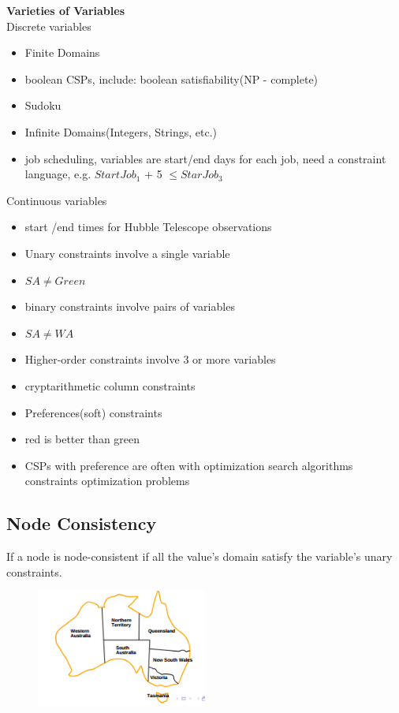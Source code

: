 \textbf{Varieties of Variables}\\
Discrete variables
\begin{itemize}
\item Finite Domains
\item boolean CSPs, include: boolean satisfiability(NP - complete)
\item Sudoku
\item Infinite Domains(Integers, Strings, etc.)

\item job scheduling, variables are start/end days for each job, need a constraint language, e.g. $StartJob_1$ + 5 $\leq  StarJob_3$
\end{itemize}
Continuous variables
\begin{itemize}
\item start /end times for Hubble Telescope observations
\item Unary constraints involve a single variable
\setlength{\itemindent}{3em}
\item $SA \neq Green$
\setlength{\itemindent}{0em}
\item binary constraints involve pairs of variables
\setlength{\itemindent}{3em}
\item $SA \neq WA$
\setlength{\itemindent}{0em}
\item Higher-order constraints involve 3 or more variables	
\setlength{\itemindent}{3em}
\item cryptarithmetic column constraints
\setlength{\itemindent}{0em}
\item Preferences(soft) constraints
\setlength{\itemindent}{3em}
\item red  is better than green
\item CSPs with preference are often with optimization search algorithms constraints optimization problems 
\end{itemize}


\subsection{Node Consistency}
If a node is node-consistent if all the value’s domain satisfy the variable’s unary constraints.\\[3ex]

\begin{figure}[h]
\centering
\includegraphics[width=0.5\textwidth]{chap1_pics/austaliaareas.png} 
\end{figure}


